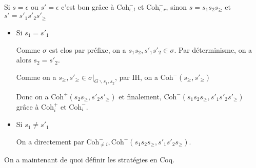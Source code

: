 \documentclass[a4paper,12ptCOUCOU
]{article}
\newlength{\mydepth}
\newlength{\myheight}
\newenvironment{answer}
{\par\begin{lrbox}{\mybox}\quad\begin{minipage}{\linewidth}\color{black}\setlength{\parskip}{10pt plus 1pt minus 1pt}\vspace*{-.7\baselineskip}}
{\end{minipage}\end{lrbox}
\settodepth{\mydepth}{\usebox{\mybox}}
\settoheight{\myheight}{\usebox{\mybox}}
\addtolength{\myheight}{\mydepth}
\noindent\makebox[0pt]{
  \color{gray}\hspace{-0pt}\rule[-\mydepth]{1pt}{\myheight}}
\usebox{\mybox}
  }
\begin{document}
\begin{minipage}{\linewidth}
\begin{answer}
Si $s=\epsilon$ ou $s'=\epsilon$ c'est bon grâce à
$\text{Coh}^-_{\epsilon, l}$ et $\text{Coh}^-_{\epsilon, r}$, sinon
$s = s_1 s_2 s_\geq$ et $s' = s'_1 s'_2 s'_\geq$
\begin{itemize}
\item Si $s_1 = s'_1$

Comme $\sigma$ est clos par préfixe, on a $s_1 s_2, s'_1 s'_2 \in \sigma$.
Par déterminisme, on a alors $s_2 = s'_2$.

Comme on a $s_\geq, s'_\geq \in \sigma |_{G\backslash s_1,s_2}$, par IH,
on a $\text{Coh}^-(s_\geq, s'_\geq)$

Donc on a $\text{Coh}^+(s_2 s_\geq, s'_2 s'_\geq)$ et finalement,
$\text{Coh}^-(s_1 s_2 s_\geq, s'_1 s'_2 s'_\geq)$ grâce à
$\text{Coh}_i^+$ et $\text{Coh}_i^-$.


\item Si $s_1 \neq s'_1$

On a directement par $\text{Coh}_{\neq i}^-, \text{Coh}^-(s_1 s_2 s_\geq, s'_1 s'_2 s_\geq)$.

\end{itemize}
\end{answer}\end{minipage}

On a maintenant de quoi définir les stratégies en Coq.
\printbibliography
\end{document}
